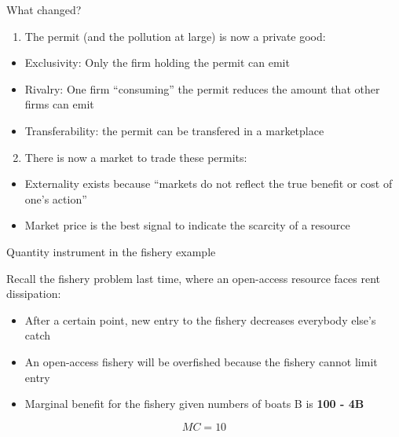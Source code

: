\begin{frame}{What changed?}
\protect\hypertarget{what-changed}{}

\begin{enumerate}
\tightlist
\item
  The permit (and the pollution at large) is now a private good:
\end{enumerate}

\begin{itemize}
\tightlist
\item
  Exclusivity: Only the firm holding the permit can emit
\item
  Rivalry: One firm ``consuming'' the permit reduces the amount that
  other firms can emit
\item
  Transferability: the permit can be transfered in a marketplace
\end{itemize}

\begin{enumerate}
\setcounter{enumi}{1}
\tightlist
\item
  There is now a market to trade these permits:
\end{enumerate}

\begin{itemize}
\tightlist
\item
  Externality exists because ``markets do not reflect the true benefit
  or cost of one's action''
\item
  Market price is the best signal to indicate the scarcity of a resource
\end{itemize}

\end{frame}

\begin{frame}{Quantity instrument in the fishery example}
\protect\hypertarget{quantity-instrument-in-the-fishery-example}{}

Recall the fishery problem last time, where an open-access resource
faces rent dissipation:

\begin{itemize}
\tightlist
\item
  After a certain point, new entry to the fishery decreases everybody
  else's catch
\item
  An open-access fishery will be overfished because the fishery cannot
  limit entry
\end{itemize}

\end{frame}

\begin{frame}{}
\protect\hypertarget{section-12}{}

\begin{itemize}
\tightlist
\item
  Marginal benefit for the fishery given numbers of boats B is
  \textbf{100 - 4B}
\end{itemize}

\[MC = 10\]

\end{frame}

